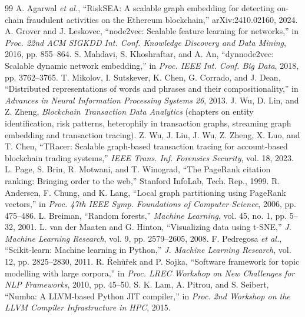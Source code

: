 \renewcommand{\bibname}{References}
{\singlespacing\raggedright
\begin{thebibliography}{99}
\setlength{\itemsep}{4pt}
 A. Agarwal \emph{et al.}, ``RiskSEA: A scalable graph embedding for detecting on-chain fraudulent activities on the Ethereum blockchain,'' arXiv:2410.02160, 2024.
 A. Grover and J. Leskovec, ``node2vec: Scalable feature learning for networks,'' in \emph{Proc. 22nd ACM SIGKDD Int. Conf. Knowledge Discovery and Data Mining}, 2016, pp. 855--864.
 S. Mahdavi, S. Khoshraftar, and A. An, ``dynnode2vec: Scalable dynamic network embedding,'' in \emph{Proc. IEEE Int. Conf. Big Data}, 2018, pp. 3762--3765.
 T. Mikolov, I. Sutskever, K. Chen, G. Corrado, and J. Dean, ``Distributed representations of words and phrases and their compositionality,'' in \emph{Advances in Neural Information Processing Systems 26}, 2013.
 J. Wu, D. Lin, and Z. Zheng, \emph{Blockchain Transaction Data Analytics} (chapters on entity identification, risk patterns, heterophily in transaction graphs, streaming graph embedding and transaction tracing).
 Z. Wu, J. Liu, J. Wu, Z. Zheng, X. Luo, and T. Chen, ``TRacer: Scalable graph-based transaction tracing for account-based blockchain trading systems,'' \emph{IEEE Trans. Inf. Forensics Security}, vol. 18, 2023.
 L. Page, S. Brin, R. Motwani, and T. Winograd, ``The PageRank citation ranking: Bringing order to the web,'' Stanford InfoLab, Tech. Rep., 1999.
 R. Andersen, F. Chung, and K. Lang, ``Local graph partitioning using PageRank vectors,'' in \emph{Proc. 47th IEEE Symp. Foundations of Computer Science}, 2006, pp. 475--486.
 L. Breiman, ``Random forests,'' \emph{Machine Learning}, vol. 45, no. 1, pp. 5--32, 2001.
 L. van der Maaten and G. Hinton, ``Visualizing data using t-SNE,'' \emph{J. Machine Learning Research}, vol. 9, pp. 2579--2605, 2008.
 F. Pedregosa \emph{et al.}, ``Scikit-learn: Machine learning in Python,'' \emph{J. Machine Learning Research}, vol. 12, pp. 2825--2830, 2011.
 R. \v{R}eh\r{u}\v{r}ek and P. Sojka, ``Software framework for topic modelling with large corpora,'' in \emph{Proc. LREC Workshop on New Challenges for NLP Frameworks}, 2010, pp. 45--50.
 S. K. Lam, A. Pitrou, and S. Seibert, ``Numba: A LLVM-based Python JIT compiler,'' in \emph{Proc. 2nd Workshop on the LLVM Compiler Infrastructure in HPC}, 2015.

\end{thebibliography}}

